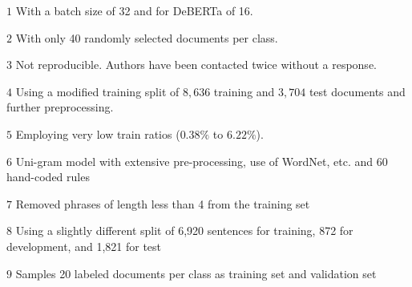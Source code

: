\documentclass[runningheads]{llncs}
\begin{document}
\begin{table*}[!ht]
\begin{threeparttable}
        \begin{tablenotes} 
            \item[$1$] With a batch size of 32 and for DeBERTa of 16.
            \item[$2$] With only 40 randomly selected documents per class.
            \item[$3$]Not reproducible. Authors have been contacted twice without a response.
            \item[$4$] Using a modified training split of $8,636$ training and $3,704$ test documents and further preprocessing.
            \item[$5$] Employing very low train ratios ($0.38\%$ to $6.22\%$).
            \item[$6$] Uni-gram model with extensive pre-processing, use of WordNet, etc. and 60 hand-coded rules
            \item[$7$] Removed phrases of length less than 4 from the training set
            \item[$8$] Using a slightly different split of 6,920 sentences for training, 872 for development, and 1,821 for test
            \item[$9$] Samples 20 labeled documents per class as training set and validation set
        \end{tablenotes}
    \end{threeparttable}
\end{table*}
\end{document}
